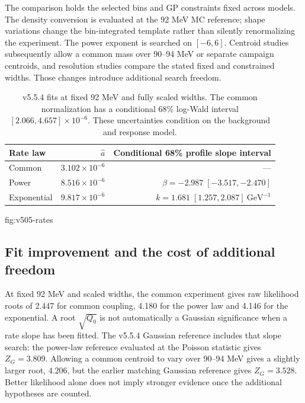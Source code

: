 The comparison holds the selected bins and GP constraints fixed across
models. The density conversion is evaluated at the 92 MeV MC reference;
shape variations change the bin-integrated template rather than silently
renormalizing the experiment. The power exponent is searched on $[-6,6]$.
Centroid studies subsequently allow a common mass over 90--94 MeV or separate
campaign centroids, and resolution studies compare the stated fixed and
constrained widths. Those changes introduce additional search freedom.

\begin{table}[htbp]\centering\small
\begin{tabular}{lrr}\toprule
Rate law & $\widehat a$ & Conditional 68\% profile slope interval\\\midrule
Common & $3.102\times10^{-6}$ & ---\\
Power & $8.516\times10^{-6}$ & $\beta=-2.987\;[-3.517,-2.470]$\\
Exponential & $9.817\times10^{-6}$ & $k=1.681\;[1.257,2.087]~\mathrm{GeV}^{-1}$\\
\bottomrule\end{tabular}
\caption{v5.5.4 fits at fixed 92 MeV and fully scaled widths. The common
normalization has a conditional 68\% log-Wald interval
$[2.066,4.657]\times10^{-6}$. These uncertainties condition on the
background and response model.}\label{tab:v505-rates}\end{table}

{fig:v505-rates}

\subsection{Fit improvement and the cost of additional freedom}
At fixed 92 MeV and scaled widths, the common experiment gives raw likelihood
roots of 2.447 for common coupling, 4.180 for the power law and 4.146 for the
exponential. A root $\sqrt{Q_0}$ is not automatically a Gaussian significance
when a rate slope has been fitted. The v5.5.4 Gaussian reference includes
that slope search: the power-law reference evaluated at the Poisson
statistic gives $Z_G=3.809$. Allowing a common centroid to vary over
90--94 MeV gives a slightly larger root, 4.206, but the earlier matching
Gaussian reference gives $Z_G=3.528$. Better likelihood alone does not imply
stronger evidence once the additional hypotheses are counted.

